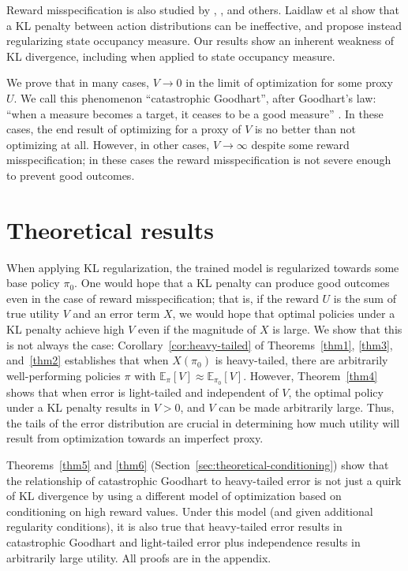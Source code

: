 \documentclass{article}
\begin{document}
Reward misspecification is also studied by \citep{lambert2024alignment}, \citep{laidlaw2024preventing}, and others. Laidlaw et al show that a KL penalty between action distributions can be ineffective, and propose instead regularizing state occupancy measure. Our results show an inherent weakness of KL divergence, including when applied to state occupancy measure.

We prove that in many cases, $V \to 0$ in the limit of optimization for some proxy $U$. We call this phenomenon ``catastrophic Goodhart'', after Goodhart's law: ``when a measure becomes a target, it ceases to be a good measure'' \citep{Strathern_1997}. In these cases, the end result of optimizing for a proxy of $V$ is no better than not optimizing at all. However, in other cases, $V \to \infty$ despite some reward misspecification; in these cases the reward misspecification is not severe enough to prevent good outcomes. 

\section{Theoretical results}

When applying KL regularization, the trained model is regularized towards some base policy $\pi_0$. One would hope that a KL penalty can produce good outcomes even in the case of reward misspecification; that is, if the reward $U$ is the sum of true utility $V$ and an error term $X$, we would hope that optimal policies under a KL penalty achieve high $V$ even if the magnitude of $X$ is large. We show that this is not always the case: Corollary~\ref{cor:heavy-tailed} of Theorems~\ref{thm1}, \ref{thm3}, and~\ref{thm2} establishes that when $X(\pi_0)$ is heavy-tailed, there are arbitrarily well-performing policies $\pi$ with $\mathbb E_{\pi}[V] \approx \mathbb E_{\pi_0}[V]$. However, Theorem~\ref{thm4} shows that when error is light-tailed and independent of $V$, the optimal policy under a KL penalty results in $V > 0$, and $V$ can be made arbitrarily large. Thus, the tails of the error distribution are crucial in determining how much utility will result from optimization towards an imperfect proxy.

Theorems~\ref{thm5} and \ref{thm6} (Section~\ref{sec:theoretical-conditioning}) show that the relationship of catastrophic Goodhart to heavy-tailed error is not just a quirk of KL divergence by using a different model of optimization based on conditioning on high reward values. Under this model (and given additional regularity conditions), it is also true that heavy-tailed error results in catastrophic Goodhart and light-tailed error plus independence results in arbitrarily large utility. All proofs are in the appendix.
\end{document}
